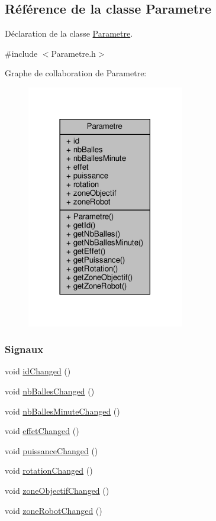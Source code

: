 \hypertarget{class_parametre}{}\subsection{Référence de la classe Parametre}
\label{class_parametre}


Déclaration de la classe \hyperlink{class_parametre}{Parametre}.  




{\ttfamily \#include $<$Parametre.\+h$>$}



Graphe de collaboration de Parametre\+:\nopagebreak
\begin{figure}[H]
\begin{center}
\leavevmode
\includegraphics[width=194pt]{class_parametre__coll__graph}
\end{center}
\end{figure}
\subsubsection*{Signaux}
\begin{DoxyCompactItemize}
\item 
void \hyperlink{class_parametre_aa76741724dcb92c1cd57f239d094aa01}{id\+Changed} ()
\item 
void \hyperlink{class_parametre_a7563d0a38151759c9f302a8a2d6c7f83}{nb\+Balles\+Changed} ()
\item 
void \hyperlink{class_parametre_a57903e139fdcc9d22d310616a3d3e7cf}{nb\+Balles\+Minute\+Changed} ()
\item 
void \hyperlink{class_parametre_a5df2cfc8ae88078fb8b29aee774e3f2a}{effet\+Changed} ()
\item 
void \hyperlink{class_parametre_a64b3714d188ff1e30ee708c1d30bce4b}{puissance\+Changed} ()
\item 
void \hyperlink{class_parametre_aa597b6999dffa17784454457d88f64d7}{rotation\+Changed} ()
\item 
void \hyperlink{class_parametre_a211162a0aa7064d469866f854248d5c0}{zone\+Objectif\+Changed} ()
\item 
void \hyperlink{class_parametre_a770fb72eb2727da9f823aba5524a903e}{zone\+Robot\+Changed} ()
\end{DoxyCompactItemize}
